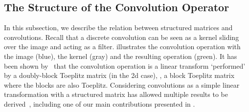 \subsection{The Structure of the Convolution Operator}
\label{subsection:ch2-the_structure_of_the_convolution_operator}

In this subsection, we describe the relation between structured matrices and convolutions.
Recall that a discrete convolution can be seen as a kernel sliding over the image and acting as a filter.
 illustrates the convolution operation with the image (blue), the kernel (gray) and the resulting operation (green).
It has been shown by~\citet{jain1989fundamentals} that the convolution operation is a linear transform `performed' by a doubly-block Toeplitz matrix (in the 2d case), \ie, a block Toeplitz matrix where the blocks are also Toeplitz.
Considering convolutions as a simple linear transformation with a structured matrix has allowed multiple results to be derived~\citet{appuswamy2016structured,wang2020orthogonal,sedghi2018singular,singla2019bounding}, including one of our main contributions presented in .



